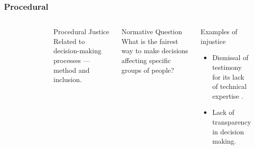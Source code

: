 \begin{frame}
    \frametitle{Procedural}
    \begin{columns}
        \column[t]{3cm}
        \begin{figure}
            \centering
        \end{figure}
        \column[t]{7cm}
        \begin{block}{Procedural Justice}
            Related to decision-making processes --- method and inclusion.
        \end{block}
        \begin{block}{Normative Question}
            What is the fairest way to make decisions affecting specific groups
            of people?
        \end{block}
        \begin{block}{Examples of injustice}
            \begin{itemize}
                \item Dismissal of testimony for its lack of technical expertise
                \cite{johnson_dakota_2021}. 
                \item Lack of transparency in decision making.
            \end{itemize}
        \end{block}
    \end{columns}
    
\end{frame}

